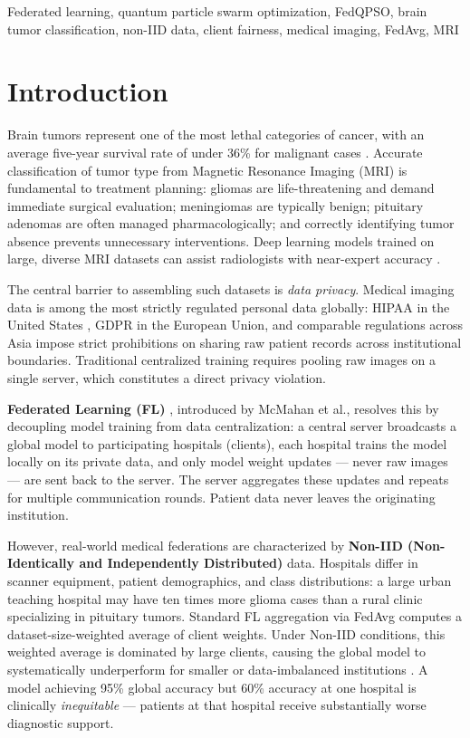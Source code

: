\documentclass[conference]{IEEEtran}
\begin{document}
\begin{IEEEkeywords}
Federated learning, quantum particle swarm optimization, FedQPSO, brain tumor
classification, non-IID data, client fairness, medical imaging, FedAvg,
MRI
\end{IEEEkeywords}

\section{Introduction}
\label{sec:intro}

Brain tumors represent one of the most lethal categories of cancer, with an
average five-year survival rate of under 36\% for malignant cases
\cite{ostrom2021}. Accurate classification of tumor type from Magnetic
Resonance Imaging (MRI) is fundamental to treatment planning: gliomas are
life-threatening and demand immediate surgical evaluation; meningiomas are
typically benign; pituitary adenomas are often managed pharmacologically; and
correctly identifying tumor absence prevents unnecessary interventions. Deep
learning models trained on large, diverse MRI datasets can assist radiologists
with near-expert accuracy \cite{sultan2019}.

The central barrier to assembling such datasets is \emph{data privacy}. Medical
imaging data is among the most strictly regulated personal data globally:
HIPAA in the United States \cite{hipaa}, GDPR in the European Union, and
comparable regulations across Asia impose strict prohibitions on sharing raw
patient records across institutional boundaries. Traditional centralized
training requires pooling raw images on a single server, which constitutes a
direct privacy violation.

\textbf{Federated Learning (FL)} \cite{mcmahan2017}, introduced by McMahan
et al., resolves this by decoupling model training from data centralization: a
central server broadcasts a global model to participating hospitals (clients),
each hospital trains the model locally on its private data, and only model
weight updates --- never raw images --- are sent back to the server. The
server aggregates these updates and repeats for multiple communication rounds.
Patient data never leaves the originating institution.

However, real-world medical federations are characterized by
\textbf{Non-IID (Non-Identically and Independently Distributed)} data. Hospitals
differ in scanner equipment, patient demographics, and class distributions: a
large urban teaching hospital may have ten times more glioma cases than a
rural clinic specializing in pituitary tumors. Standard FL aggregation via
FedAvg \cite{mcmahan2017} computes a dataset-size-weighted average of client
weights. Under Non-IID conditions, this weighted average is dominated by
large clients, causing the global model to systematically underperform for
smaller or data-imbalanced institutions \cite{zhao2018}. A model achieving
95\% global accuracy but 60\% accuracy at one hospital is clinically
\emph{inequitable} --- patients at that hospital receive substantially worse
diagnostic support.
\end{document}
